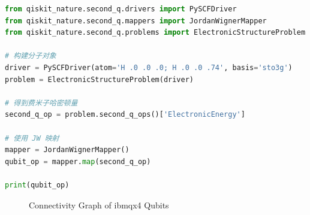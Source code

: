 \begin{lstlisting}[language=Python, caption=Generating Hamilton, frame=single, label={lst:HamiltonGeneration}]
from qiskit_nature.second_q.drivers import PySCFDriver
from qiskit_nature.second_q.mappers import JordanWignerMapper
from qiskit_nature.second_q.problems import ElectronicStructureProblem

# 构建分子对象
driver = PySCFDriver(atom='H .0 .0 .0; H .0 .0 .74', basis='sto3g')
problem = ElectronicStructureProblem(driver)

# 得到费米子哈密顿量
second_q_op = problem.second_q_ops()['ElectronicEnergy']

# 使用 JW 映射
mapper = JordanWignerMapper()
qubit_op = mapper.map(second_q_op)

print(qubit_op)

\end{lstlisting}

\begin{figure}[ht]
\centering
{}
\caption{Connectivity Graph of ibmqx4 Qubits}
\label{fig:connectivity}
\end{figure}